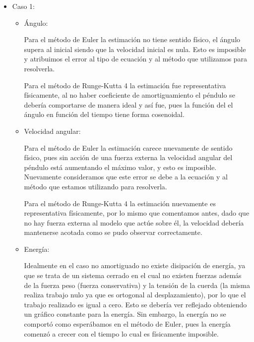 \documentclass[titlepage,a4paper]{article}
\begin{document}
    \begin{itemize}
    
    \newpage

        \item Caso 1:
        \begin{itemize}
            \item Ángulo:
            
        Para el método de Euler la estimación no tiene sentido físico, el ángulo supera al inicial siendo que la velocidad inicial es nula. Esto es imposible y atribuimos el error al tipo de ecuación y al método que utilizamos para resolverla.
            
            Para el método de Runge-Kutta 4 la estimación fue representativa físicamente, al no haber coeficiente de amortiguamiento el péndulo se debería comportarse de manera ideal y así fue, pues la función del el ángulo en función del tiempo tiene forma cosenoidal.

            
            \item Velocidad angular:
            
            Para el método de Euler la estimación carece nuevamente de sentido físico, pues sin acción de una fuerza externa la velocidad angular del péndulo está aumentando el máximo valor, y esto es imposible. Nuevamente consideramos que este error se debe a la ecuación y al método que estamos utilizando para resolverla.
            
            Para el método de Runge-Kutta 4 la estimación nuevamente es representativa físicamente, por lo mismo que comentamos antes, dado que no hay fuerza externa al modelo que actúe sobre él, la velocidad debería mantenerse acotada como se pudo observar correctamente. 


            \item Energía:
            
            Idealmente en el caso no amortiguado no existe disipación de energía, ya que se trata de un sistema cerrado en el cual no existen fuerzas además de la fuerza peso (fuerza conservativa) y la tensión de la cuerda (la misma realiza trabajo nulo ya que es ortogonal al desplazamiento), por lo que el trabajo realizado es igual a cero.  Esto se debería ver reflejado obteniendo un gráfico constante para la energía.  Sin embargo, la energía no se comportó como esperábamos en el método de Euler, pues la energía comenzó a crecer con el tiempo lo cual es físicamente imposible.
            

\end{itemize}
\end{itemize}
\end{document}

